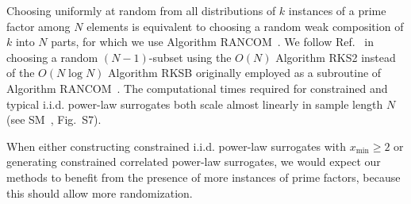 \documentclass[%
prx,
reprint,
superscriptaddress,
nofootinbib,
 amsmath,amssymb,
 aps,
floatfix,
]{revtex4-2}
\begin{document}
Choosing uniformly at random from all distributions of $k$ instances of a prime factor among $N$ elements is equivalent to choosing a random weak composition of $k$ into $N$ parts, for which we use Algorithm RANCOM~\cite{nijenhuis2014combinatorial}. We follow Ref.~\cite{stumpf2017combalg} in choosing a random $(N - 1)$-subset using the $O(N)$ Algorithm RKS2 instead of the $O(N \log N)$ Algorithm RKSB originally employed as a subroutine of Algorithm RANCOM~\cite{nijenhuis2014combinatorial}. The computational times required for constrained and typical i.i.d. power-law surrogates {both scale almost linearly} in sample length $N$ (see SM~\cite{supplemental}, {Fig.~S7}).

When either constructing constrained i.i.d. power-law surrogates with $x_{\min} \geq 2$ or generating constrained correlated power-law surrogates, we would expect our methods to benefit from the presence of more instances of prime factors, because this should allow more randomization.
\end{document}
